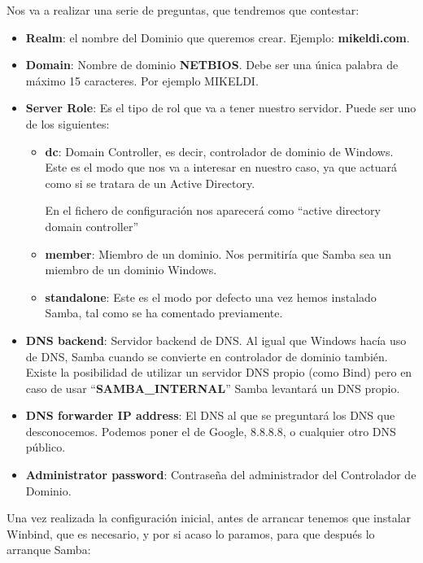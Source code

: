 Nos va a realizar una serie de preguntas, que tendremos que contestar:
\begin{itemize}
    \item \textbf{Realm}: el nombre del Dominio que queremos crear. Ejemplo: \textbf{mikeldi.com}.

    \item \textbf{Domain}: Nombre de dominio \textbf{NETBIOS}. Debe ser una única palabra de máximo 15 caracteres. Por ejemplo MIKELDI.

    \item \textbf{Server Role}: Es el tipo de rol que va a tener nuestro servidor. Puede ser uno de los siguientes:

    \begin{itemize}
        \item \textbf{dc}: Domain Controller, es decir, controlador de dominio de Windows. Este es el modo que nos va a interesar en nuestro caso, ya que actuará como si se tratara de un Active Directory.

        En el fichero de configuración nos aparecerá como “active directory domain controller”

        \item \textbf{member}: Miembro de un dominio. Nos permitiría que Samba sea un miembro de un dominio Windows.

        \item \textbf{standalone}: Este es el modo por defecto una vez hemos instalado Samba, tal como se ha comentado previamente.
    \end{itemize}

    \item \textbf{DNS backend}: Servidor backend de DNS. Al igual que Windows hacía uso de DNS, Samba cuando se convierte en controlador de dominio también. Existe la posibilidad de utilizar un servidor DNS propio (como Bind) pero en caso de usar “\textbf{SAMBA\_INTERNAL}” Samba levantará un DNS propio.

    \item \textbf{DNS forwarder IP address}: El DNS al que se preguntará los DNS que desconocemos. Podemos poner el de Google, 8.8.8.8, o cualquier otro DNS público.

    \item \textbf{Administrator password}:  Contraseña del administrador del Controlador de Dominio.
\end{itemize}

Una vez realizada la configuración inicial, antes de arrancar tenemos que instalar Winbind, que es necesario, y por si acaso lo paramos, para que después lo arranque Samba:

